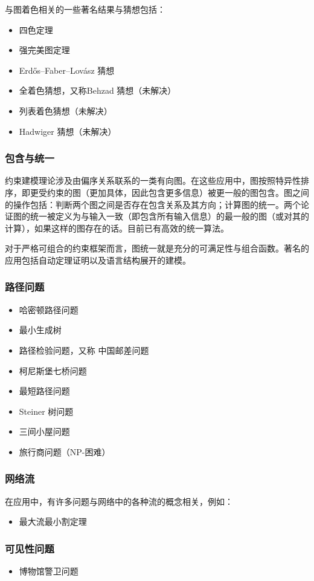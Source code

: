 与图着色相关的一些著名结果与猜想包括：
\begin{itemize}
\item 四色定理
\item 强完美图定理
\item Erdős–Faber–Lovász 猜想
\item 全着色猜想，又称Behzad 猜想（未解决）
\item 列表着色猜想（未解决）
\item Hadwiger 猜想（未解决）
\end{itemize}
\subsubsection{包含与统一}
约束建模理论涉及由偏序关系联系的一类有向图。在这些应用中，图按照特异性排序，即更受约束的图（更加具体，因此包含更多信息）被更一般的图包含。图之间的操作包括：判断两个图之间是否存在包含关系及其方向；计算图的统一。两个论证图的统一被定义为与输入一致（即包含所有输入信息）的最一般的图（或对其的计算），如果这样的图存在的话。目前已有高效的统一算法。

对于严格可组合的约束框架而言，图统一就是充分的可满足性与组合函数。著名的应用包括自动定理证明以及语言结构展开的建模。
\subsubsection{路径问题}
\begin{itemize}
\item 哈密顿路径问题
\item 最小生成树
\item 路径检验问题，又称 中国邮差问题
\item 柯尼斯堡七桥问题
\item 最短路径问题
\item Steiner 树问题
\item 三间小屋问题
\item 旅行商问题（NP-困难）
\end{itemize}
\subsubsection{网络流}
在应用中，有许多问题与网络中的各种流的概念相关，例如：
\begin{itemize}
\item 最大流最小割定理
\end{itemize}
\subsubsection{可见性问题}
\begin{itemize}
\item 博物馆警卫问题
\end{itemize}

